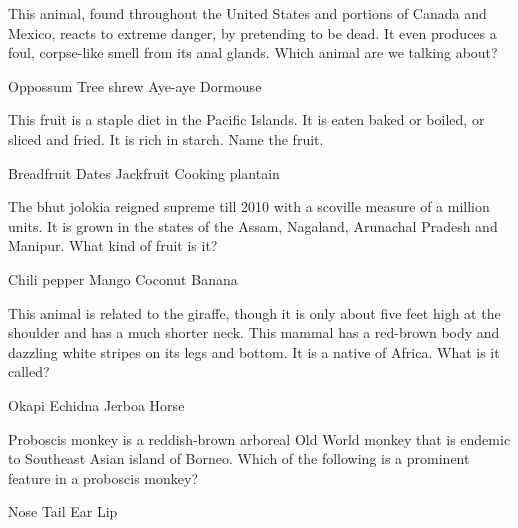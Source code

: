 \begin{questions}
\question This animal, found throughout the United States and portions of Canada and Mexico, reacts to extreme danger, by pretending to be dead. It even produces a foul, corpse-like smell from its anal glands. Which animal are we talking about?

\begin{randomizeoneparchoices}
    \CorrectChoice Oppossum
    \choice Tree shrew
    \choice Aye-aye
    \choice Dormouse
\end{randomizeoneparchoices}

    \question This fruit is a staple diet in the Pacific Islands. It is eaten baked or boiled, or sliced and fried. It is rich in starch. Name the fruit.

\begin{randomizeoneparchoices}
    \CorrectChoice Breadfruit
    \choice Dates
    \choice Jackfruit
    \choice Cooking plantain
\end{randomizeoneparchoices}

\question The bhut jolokia reigned supreme till 2010 with a scoville measure of a million units. It is grown in the states of the Assam, Nagaland, Arunachal Pradesh and Manipur. What kind of fruit is it?

\begin{randomizeoneparchoices}
    \CorrectChoice Chili pepper
    \choice Mango
    \choice Coconut
    \choice Banana
\end{randomizeoneparchoices}

\question This animal is related to the giraffe, though it is only about five feet high at the shoulder and has a much shorter neck. This mammal has a red-brown body and dazzling white stripes on its legs and bottom. It is a native of Africa. What is it called?

\begin{randomizeoneparchoices}
    \CorrectChoice Okapi
    \choice Echidna
    \choice Jerboa
    \choice Horse
\end{randomizeoneparchoices}

\question Proboscis monkey is a reddish-brown arboreal Old World monkey that is endemic to Southeast Asian island of Borneo. Which of the following is a prominent feature in a proboscis monkey?

\begin{randomizeoneparchoices}
    \CorrectChoice Nose
    \choice Tail
    \choice Ear
    \choice Lip
\end{randomizeoneparchoices}


\end{questions}
